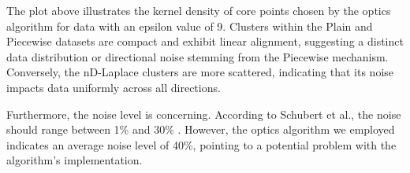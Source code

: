 The plot above illustrates the kernel density of core points chosen by the \gls{optics} algorithm for data with an epsilon value of 9. Clusters within the Plain and Piecewise datasets are compact and exhibit linear alignment, suggesting a distinct data distribution or directional noise stemming from the Piecewise mechanism. Conversely, the nD-Laplace clusters are more scattered, indicating that its noise impacts data uniformly across all directions.

Furthermore, the noise level is concerning. According to Schubert et al., the noise should range between 1\% and 30\% \citep{schubert_dbscan_2017}. However, the \gls{optics} algorithm we employed indicates an average noise level of 40\%, pointing to a potential problem with the algorithm's implementation. 



